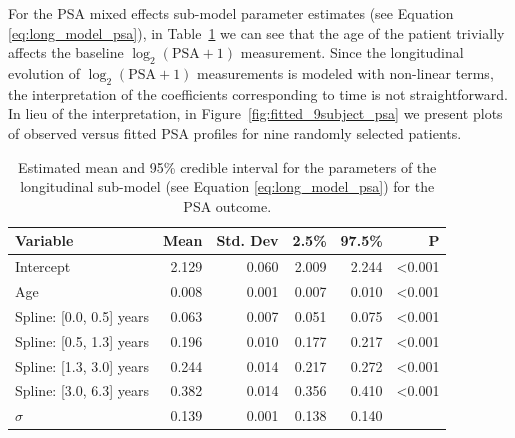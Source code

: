 For the PSA mixed effects sub-model parameter estimates (see Equation \ref{eq:long_model_psa}), in Table~\ref{tab:PSA_long} we can see that the age of the patient trivially affects the baseline ${\log_2(\mbox{PSA} + 1)}$ measurement. Since the longitudinal evolution of ${\log_2 (\mbox{PSA} + 1)}$ measurements is modeled with non-linear terms, the interpretation of the coefficients corresponding to time is not straightforward. In lieu of the interpretation, in Figure~\ref{fig:fitted_9subject_psa} we present plots of observed versus fitted PSA profiles for nine randomly selected patients. 
\begin{table}
\small\sf\centering
\caption{Estimated mean and 95\% credible interval for the parameters of the longitudinal sub-model (see Equation \ref{eq:long_model_psa}) for the PSA outcome.}
\label{tab:PSA_long}
\begin{tabular}{lrrrrr}
\hline
Variable                         & Mean & Std. Dev & 2.5\%  & 97.5\% & P     \\
\hline
Intercept & 2.129    & 0.060  & 2.009 & 2.244 & \textless0.001 \\
Age & 0.008    & 0.001 & 0.007 & 0.010   &\textless0.001 \\
Spline: [0.0, 0.5] years & 0.063    & 0.007 & 0.051 & 0.075  & \textless0.001 \\
Spline: [0.5, 1.3] years & 0.196    & 0.010  & 0.177 & 0.217  & \textless0.001 \\
Spline: [1.3, 3.0] years & 0.244    & 0.014 & 0.217 & 0.272  & \textless0.001 \\
Spline: [3.0, 6.3] years & 0.382    & 0.014 & 0.356 & 0.410 &  \textless0.001 \\
$\sigma$ & 0.139    & 0.001 & 0.138 & 0.140  & \\
\hline
\end{tabular}
\end{table}

